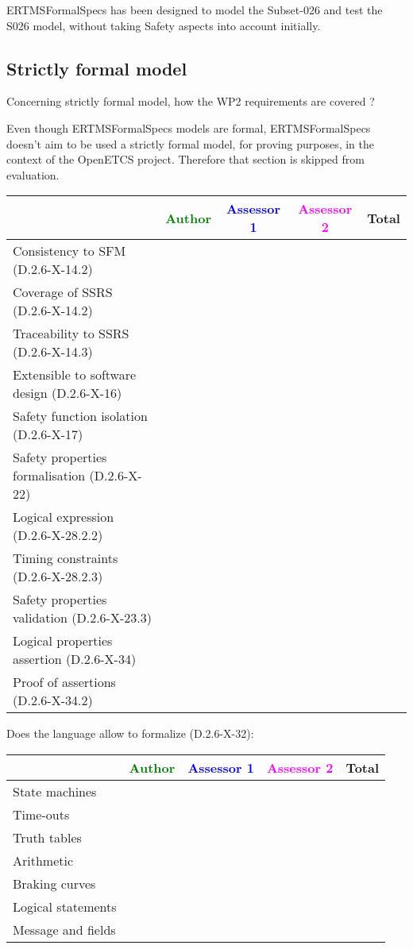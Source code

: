 \begin{author_comment}
ERTMSFormalSpecs has been designed to model the Subset-026 and test the S026 model, without taking Safety aspects into account initially.    
\end{author_comment}
\subsection{Strictly formal model}

Concerning strictly formal model, how the WP2 requirements are covered ?

\begin{author_comment}
Even though ERTMSFormalSpecs models are formal, ERTMSFormalSpecs doesn't aim to be used a strictly formal model, for proving purposes, in the context of the OpenETCS project. Therefore that section is skipped from evaluation.  
\end{author_comment}

\begin{tabular}{|l | c | c | c | c|}
\hline
& \textcolor{green}{Author} & \textcolor{blue}{Assessor 1} & \textcolor{magenta}{Assessor 2} & Total \\
\hline 
Consistency to SFM (D.2.6-X-14.2) & & & &  \\
\hline
Coverage of SSRS (D.2.6-X-14.2)  & & & &  \\
\hline
Traceability to  SSRS (D.2.6-X-14.3)  & & & &  \\
\hline
Extensible to software design (D.2.6-X-16)  & & & &  \\
\hline
Safety function isolation (D.2.6-X-17)  & & & &  \\
\hline 
Safety properties formalisation (D.2.6-X-22)  & & & &  \\
\hline
Logical expression (D.2.6-X-28.2.2)  & & & &  \\
\hline
Timing constraints (D.2.6-X-28.2.3)  & & & &  \\
\hline
Safety properties validation (D.2.6-X-23.3)  & & & &  \\
\hline
Logical properties assertion (D.2.6-X-34)  & & & &  \\
\hline
Proof of assertions (D.2.6-X-34.2)  & & & &  \\
\hline
\end{tabular}

Does the language allow to  formalize (D.2.6-X-32):

\begin{tabular}{|l | c | c | c | c|}
\hline
& \textcolor{green}{Author} & \textcolor{blue}{Assessor 1} & \textcolor{magenta}{Assessor 2} & Total \\
\hline 
State machines  & & & &  \\
\hline
Time-outs  & & & &  \\
\hline
Truth tables  & & & &  \\
\hline
Arithmetic  & & & &  \\
\hline
Braking curves  & & & &  \\
\hline
Logical statements & & & &  \\
\hline
Message and fields & & & &  \\
\hline
\end{tabular}

